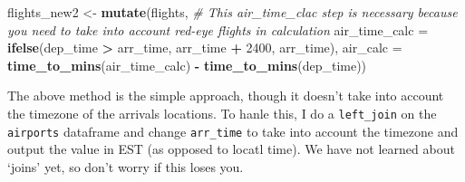 \documentclass[]{book}
\newenvironment{Shaded}{\begin{snugshade}}{\end{snugshade}}
\newcommand{\CommentTok}[1]{\textcolor[rgb]{0.56,0.35,0.01}{\textit{#1}}}
\newcommand{\DataTypeTok}[1]{\textcolor[rgb]{0.13,0.29,0.53}{#1}}
\newcommand{\DecValTok}[1]{\textcolor[rgb]{0.00,0.00,0.81}{#1}}
\newcommand{\KeywordTok}[1]{\textcolor[rgb]{0.13,0.29,0.53}{\textbf{#1}}}
\newcommand{\NormalTok}[1]{#1}
\newcommand{\OperatorTok}[1]{\textcolor[rgb]{0.81,0.36,0.00}{\textbf{#1}}}
\newcommand{\StringTok}[1]{\textcolor[rgb]{0.31,0.60,0.02}{#1}}
\theoremstyle{definition}
\theoremstyle{definition}
\theoremstyle{definition}
\theoremstyle{remark}
\begin{document}
\begin{Shaded}
\begin{Highlighting}[]
\NormalTok{flights_new2 <-}\StringTok{ }\KeywordTok{mutate}\NormalTok{(flights, }
       \CommentTok{# This air_time_clac step is necessary because you need to take into account red-eye flights in calculation}
       \DataTypeTok{air_time_calc =} \KeywordTok{ifelse}\NormalTok{(dep_time }\OperatorTok{>}\StringTok{ }\NormalTok{arr_time, arr_time }\OperatorTok{+}\StringTok{ }\DecValTok{2400}\NormalTok{, arr_time), }
       \DataTypeTok{air_calc =} \KeywordTok{time_to_mins}\NormalTok{(air_time_calc) }\OperatorTok{-}\StringTok{ }\KeywordTok{time_to_mins}\NormalTok{(dep_time)) }
\end{Highlighting}
\end{Shaded}

The above method is the simple approach, though it doesn't take into
account the timezone of the arrivals locations. To hanle this, I do a
\texttt{left\_join} on the \texttt{airports} dataframe and change
\texttt{arr\_time} to take into account the timezone and output the
value in EST (as opposed to locatl time). We have not learned about
`joins' yet, so don't worry if this loses you.

\begin{Shaded}
\end{Shaded}
\end{document}
